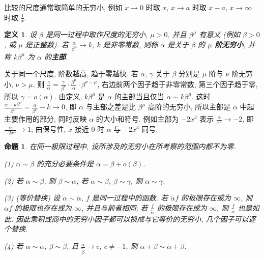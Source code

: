 \documentclass[UTF8,openany]{ctexbook}
\theoremstyle{chinesetextbook}
\newtheorem{definition}{定义}[section]
\newtheorem{proposition}{命题}[section]
\begin{document}
比较的尺度通常取简单的无穷小, 例如 $x\to0$ 时取 $x$, $x\to a$ 时取 $x-a$, $x\to\infty$ 时取 $\displaystyle\frac1x$.
\begin{definition}
设 $\beta$ 是同一过程中取作尺度的无穷小, $\mu>0$, 并且 $\beta^\mu$ 有意义 (例如 $\beta>0$, 或 $\mu$ 是正整数). 若 $\displaystyle\frac\alpha{\beta^\mu}\to k$, $k$ 是非零常数, 则称 $\alpha$ 是关于 $\beta$ 的 \textbf{$\mu$ 阶无穷小}, 并称 $k\beta^\mu$ 为 $\alpha$ 的\textbf{主部}.
\end{definition}
关于同一个尺度, 阶数越高, 趋于零越快. 若 $\alpha$, $\gamma$ 关于 $\beta$ 分别是 $\mu$ 阶与 $\nu$ 阶无穷小, $\nu>\mu$, 则 $\displaystyle\frac\gamma\alpha=\frac\gamma{\beta^\nu}\cdot\frac{\beta^\mu}\alpha\cdot\beta^{\nu-\mu}$, 右边前两个因子趋于非零常数, 第三个因子趋于零, 所以 $\gamma=o(\alpha)$. 由定义, $k\beta^\mu$ 是 $\alpha$ 的主部当且仅当 $\alpha\sim k\beta^\mu$. 这时 $\displaystyle\frac{\alpha-k\beta^\mu}{\beta^\mu}=\frac\alpha{\beta^\mu}-k\to0$, 即 $\alpha$ 与主部之差是比 $\beta^\mu$ 高阶的无穷小, 所以主部是 $\alpha$ 中起主要作用的部分, 同时反映 $\alpha$ 的大小和符号. 例如主部为 $-2x^3$ 表示 $\displaystyle\frac\alpha{x^3}\to-2$, 即 $\displaystyle\frac\alpha{-2x^3}\to1$; 由保号性, $x$ 接近 $0$ 时 $\alpha$ 与 $-2x^3$ 同号.
\begin{proposition}
在同一极限过程中, 设所涉及的无穷小在所考察的范围内都不为零.

\textup{(1)} $\alpha\sim\beta$ 的充分必要条件是 $\alpha=\beta+o(\beta)$.

\textup{(2)} 若 $\alpha\sim\beta$, 则 $\beta\sim\alpha$; 若 $\alpha\sim\beta$, $\beta\sim\gamma$, 则 $\alpha\sim\gamma$.

\textup{(3)} (等价替换) 设 $\alpha\sim\widetilde\alpha$, $f$ 是同一过程中的函数. 若 $\widetilde\alpha f$ 的极限存在或为 $\infty$, 则 $\alpha f$ 的极限也存在或为 $\infty$, 并且与前者相同; 若 $\displaystyle\frac f{\widetilde\alpha}$ 的极限存在或为 $\infty$, 则 $\displaystyle\frac f\alpha$ 也是如此. 因此乘积或商中的无穷小因子都可以换成与它等价的无穷小, 几个因子可以逐个替换.

\textup{(4)} 若 $\alpha\sim\widetilde\alpha$, $\beta\sim\widetilde\beta$, 且 $\displaystyle\frac{\widetilde\alpha}{\widetilde\beta}\to c$, $c\ne-1$, 则 $\alpha+\beta\sim\widetilde\alpha+\widetilde\beta$.
\end{proposition}
\end{document}
